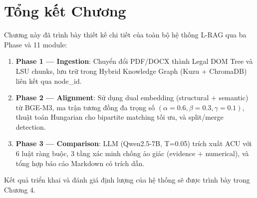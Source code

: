 \section{Tổng kết Chương}

Chương này đã trình bày thiết kế chi tiết của toàn bộ hệ thống L-RAG qua ba Phase và 11 module:

\begin{enumerate}[label=(\arabic*)]
    \item \textbf{Phase 1 — Ingestion}: Chuyển đổi PDF/DOCX thành Legal DOM Tree và LSU chunks, lưu trữ trong Hybrid Knowledge Graph (Kuzu + ChromaDB) liên kết qua node\_id.
    \item \textbf{Phase 2 — Alignment}: Sử dụng dual embedding (structural + semantic) từ BGE-M3, ma trận tương đồng đa trọng số $(\alpha=0.6, \beta=0.3, \gamma=0.1)$, thuật toán Hungarian cho bipartite matching tối ưu, và split/merge detection.
    \item \textbf{Phase 3 — Comparison}: LLM (Qwen2.5-7B, T=0.05) trích xuất ACU với 6 luật ràng buộc, 3 tầng xác minh chống ảo giác (evidence + numerical), và tổng hợp báo cáo Markdown có trích dẫn.
\end{enumerate}

Kết quả triển khai và đánh giá định lượng của hệ thống sẽ được trình bày trong Chương 4.
